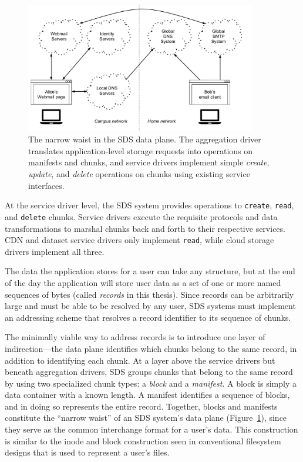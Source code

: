 \begin{figure}[h]
   \centering
   \includegraphics[width=0.9\textwidth,page=4]{figures/dissertation-figures}
   \caption{The narrow waist in the SDS data plane.  The aggregation driver
   translates application-level storage requests into operations on manifests
   and chunks, and service drivers implement simple \textit{create},
   \textit{update}, and \textit{delete} operations on chunks using existing
   service interfaces.}
   \label{fig:chap2-narrow-waist}
\end{figure}

At the service driver level, the SDS
system provides operations to \texttt{create}, \texttt{read}, and
\texttt{delete} chunks.  Service drivers execute the requisite protocols
and data transformations to
marshal chunks back and forth to their respective services.  CDN and dataset
service drivers only implement \texttt{read}, while cloud storage drivers
implement all three.

The data the application stores for a user can take any structure, but at the
end of the day the application will store user data as a set of one or more
named sequences of bytes (called \emph{records} in this thesis).  Since records
can be arbitrarily large and must be able to be resolved by any user, SDS
systems must implement an addressing scheme that resolves a record identifier to
its sequence of chunks.

The minimally viable way to address records is to introduce one layer of
indirection---the data plane identifies which chunks belong to the same record,
in addition to identifying each chunk.
At a layer above the service drivers but beneath aggregation drivers, SDS
groups chunks that belong to the same record by using two specialized
chunk types:  a \emph{block} and a \emph{manifest}.  A block is simply a data
container with a known length.  A manifest identifies a sequence of blocks, and
in doing so represents the entire record.  Together, blocks and manifests
constitute the ``narrow waist'' of an SDS system's data plane
(Figure~\ref{fig:chap2-narrow-waist}), since they serve as the common
interchange format for a user's data.  This construction is similar to the
inode and block construction seen in conventional filesystem designs that is
used to represent a user's files.

